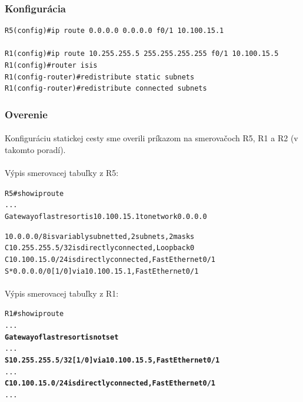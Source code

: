 \documentclass[12pt,twoside,a4paper]{report}
\begin{document}
\subsubsection{Konfigurácia}
\noindent
{\selectfont
\begin{small}
\begin{verbatim}
R5(config)#ip route 0.0.0.0 0.0.0.0 f0/1 10.100.15.1

R1(config)#ip route 10.255.255.5 255.255.255.255 f0/1 10.100.15.5
R1(config)#router isis
R1(config-router)#redistribute static subnets
R1(config-router)#redistribute connected subnets
\end{verbatim}
\end{small}
}

\subsubsection{Overenie}
\paragraph{}
Konfiguráciu statickej cesty sme overili príkazom  na smerovačoch R5, R1 a R2 (v takomto poradí).

\paragraph{}
Výpis smerovacej tabuľky z R5:

\noindent
{\selectfont
\begin{small}
\begin{alltt}
R5#show ip route
...
Gateway of last resort is 10.100.15.1 to network 0.0.0.0

     10.0.0.0/8 is variably subnetted, 2 subnets, 2 masks
C       10.255.255.5/32 is directly connected, Loopback0
C       10.100.15.0/24 is directly connected, FastEthernet0/1
S*   0.0.0.0/0 [1/0] via 10.100.15.1, FastEthernet0/1
\end{alltt}
\end{small}
}

\paragraph{}
Výpis smerovacej tabuľky z R1:

\noindent
{\selectfont
\begin{small}
\begin{alltt}
R1#show ip route
...
\textbf{Gateway of last resort is not set}
...
\textbf{S       10.255.255.5/32 [1/0] via 10.100.15.5, FastEthernet0/1}
...
\textbf{C       10.100.15.0/24 is directly connected, FastEthernet0/1}
...
\end{alltt}
\end{small}
}
\end{document}
